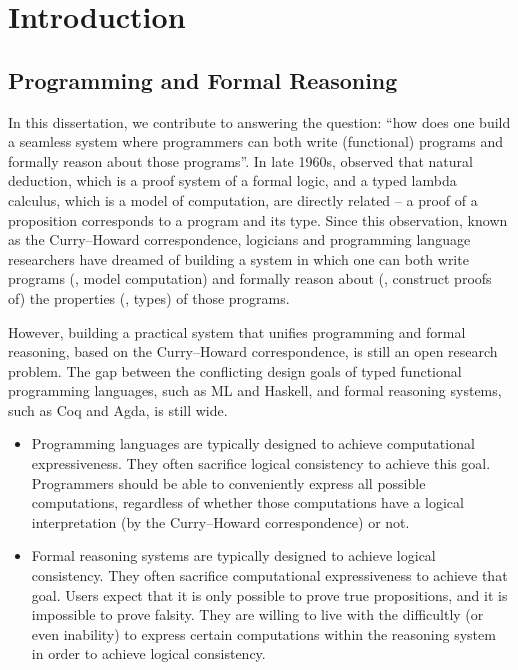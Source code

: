 \chapter{Introduction}\label{ch:intro}

\section{Programming and Formal Reasoning}\label{sec:intro:motiv}
In this dissertation, we contribute to answering the question:
``how does one build a seamless system where programmers can both
write (functional) programs and formally reason about those programs''.
In late 1960s, \citet{Howard69} observed that natural deduction, which is
a proof system of a formal logic, and a typed lambda calculus, which is
a model of computation, are directly related --
a proof of a proposition corresponds to a program and its type.
Since this observation, known as the Curry--Howard correspondence,
logicians and programming language researchers 
have  dreamed of
building a system in which one can both write programs
(\ie, model computation) and formally reason about (\ie, construct proofs of)
the properties (\ie, types) of those programs.

However, building a practical system that unifies programming and
formal reasoning, based on the Curry--Howard correspondence, is still
an open research problem. The gap between the conflicting
design goals of typed functional programming languages, such as ML and Haskell,
and formal reasoning systems, such as Coq and Agda, is still wide.

\begin{itemize}

\item
Programming languages are typically designed to achieve
computational expressiveness. They often sacrifice logical consistency
to achieve this goal. Programmers should be able to
conveniently express all possible computations, regardless of whether those
computations have a logical interpretation (by the Curry--Howard correspondence)
or not.

\item
Formal reasoning systems are typically designed to achieve logical consistency.
They often sacrifice computational expressiveness to achieve that goal.
Users expect that it is only possible to prove true propositions,
and it is impossible to prove falsity. They are willing to live with
the difficultly (or even inability) to express certain computations
within the reasoning system in order to achieve logical consistency.

\end{itemize}

